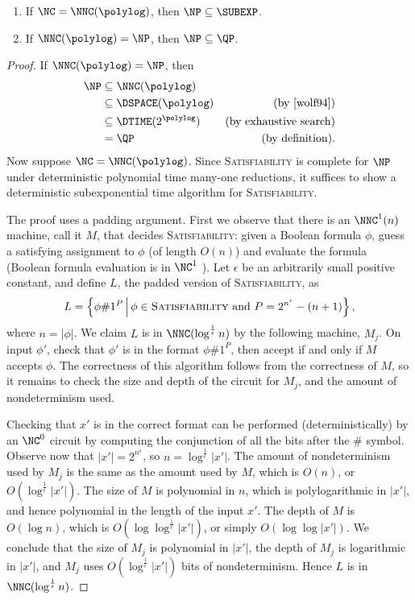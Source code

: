 \documentclass{article}
\begin{document}
\begin{theorem}
  \mbox{}
  \begin{enumerate}
  \item If $\NC = \NNC(\polylog)$, then $\NP \subseteq \SUBEXP$.
  \item If $\NNC(\polylog) = \NP$, then $\NP \subseteq \QP$.
  \end{enumerate}
\end{theorem}
\begin{proof}
  If $\NNC(\polylog) = \NP$, then
  \begin{align*}
    \NP & \subseteq \NNC(\polylog) \\
        & \subseteq \DSPACE(\polylog) & \text{(by \cite{wolf94})} \\
        & \subseteq \DTIME(2^{\polylog}) & \text{(by exhaustive search)} \\
        & = \QP & \text{(by definition)}.
  \end{align*}
  Now suppose $\NC = \NNC(\polylog)$.
  Since \textsc{Satisfiability} is complete for $\NP$ under deterministic polynomial time many-one reductions, it suffices to show a deterministic subexponential time algorithm for \textsc{Satisfiability}.

  The proof uses a padding argument.
  First we observe that there is an $\NNC^1(n)$ machine, call it $M$, that decides \textsc{Satisfiability}: given a Boolean formula $\phi$, guess a satisfying assignment to $\phi$ (of length $O(n)$) and evaluate the formula (Boolean formula evaluation is in $\NC^1$ \cite{buss87}).
  Let $\epsilon$ be an arbitrarily small positive constant, and define $L$, the padded version of \textsc{Satisfiability}, as
  \begin{equation*}
    L = \left\{ \phi \# 1^P \, \middle| \, \phi \in \textsc{Satisfiability} \text{ and } P = 2^{n^\epsilon} - (n + 1) \right\},
  \end{equation*}
  where $n = |\phi|$.
  We claim $L$ is in $\NNC(\log^\frac{1}{\epsilon} n)$ by the following machine, $M_j$.
  On input $\phi'$, check that $\phi'$ is in the format $\phi \# 1^P$, then accept if and only if $M$ accepts $\phi$.
  The correctness of this algorithm follows from the correctness of $M$, so it remains to check the size and depth of the circuit for $M_j$, and the amount of nondeterminism used.

  Checking that $x'$ is in the correct format can be performed (deterministically) by an $\NC^0$ circuit by computing the conjunction of all the bits after the $\#$ symbol.
  Observe now that $|x'| = 2^{n^\epsilon}$, so $n = \log^\frac{1}{\epsilon}{|x'|}$.
  The amount of nondeterminism used by $M_j$ is the same as the amount used by $M$, which is $O(n)$, or $O(\log^\frac{1}{\epsilon} |x'|)$.
  The size of $M$ is polynomial in $n$, which is polylogarithmic in $|x'|$, and hence polynomial in the length of the input $x'$.
  The depth of $M$ is $O(\log n)$, which is $O(\log \log^\frac{1}{\epsilon} |x'|)$, or simply $O(\log \log |x'|)$.
  We conclude that the size of $M_j$ is polynomial in $|x'|$, the depth of $M_j$ is logarithmic in $|x'|$, and $M_j$ uses $O(\log^\frac{1}{\epsilon} |x'|)$ bits of nondeterminism.
  Hence $L$ is in $\NNC(\log^\frac{1}{\epsilon} n)$.


\end{proof}
\end{document}

